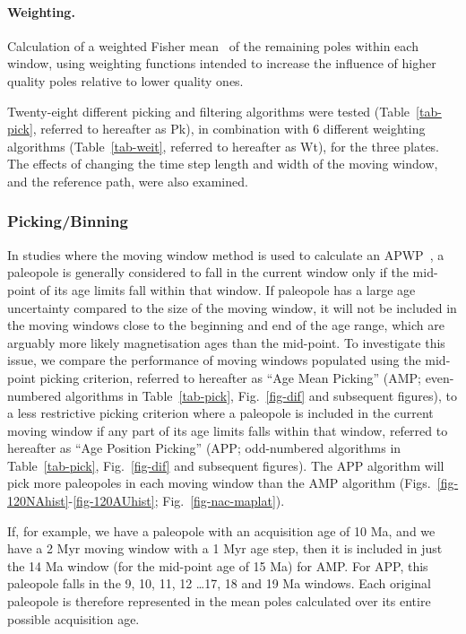 \paragraph{Weighting.} Calculation of a weighted Fisher mean~\citep{F53} of
the remaining poles within each window, using weighting functions intended to
increase the influence of higher quality poles relative to lower quality ones.

\bigskip
Twenty-eight different picking and filtering algorithms were tested
(Table~\ref{tab-pick}, referred to hereafter as Pk), in combination with 6
different weighting algorithms (Table~\ref{tab-weit}, referred to hereafter as
Wt), for the three plates. The effects of changing the time step length and
width of the moving window, and the reference path, were also examined.

\subsubsection{Picking/Binning}\label{sec:p}

In studies where the moving window method is used to calculate an
APWP~\citep{T99,T08}, a paleopole is generally considered to fall in the current
window only if the mid-point of its age limits fall within that window. If
paleopole has a large age uncertainty compared to the size of the moving window,
it will not be included in the moving windows close to the beginning and end of
the age range, which are arguably more likely magnetisation ages than the
mid-point. To investigate this issue, we compare the performance of moving
windows populated using the mid-point picking criterion, referred to hereafter
as ``Age Mean Picking'' (AMP\@; even-numbered algorithms in
Table~\ref{tab-pick}, Fig.~\ref{fig-dif} and subsequent figures), to a less
restrictive picking criterion where a paleopole is included in the current
moving window if any part of its age limits falls within that window, referred
to hereafter as ``Age Position Picking'' (APP\@; odd-numbered algorithms in
Table~\ref{tab-pick}, Fig.~\ref{fig-dif} and subsequent figures). The APP
algorithm will pick more paleopoles in each moving window than the AMP algorithm
(Figs.~\ref{fig-120NAhist}-\ref{fig-120AUhist}; Fig.~\ref{fig-nac-maplat}).

If, for example, we have a paleopole with an acquisition age of 10
Ma, and we have a 2 Myr moving window with a 1 Myr age step, then it is included
in just the 14 Ma window (for the mid-point age of 15 Ma) for
AMP\@. For APP, this paleopole falls in the 9, 10,
11, 12 \ldots 17, 18 and
19 Ma windows. Each original paleopole is therefore represented in
the mean poles calculated over its entire possible acquisition age.

